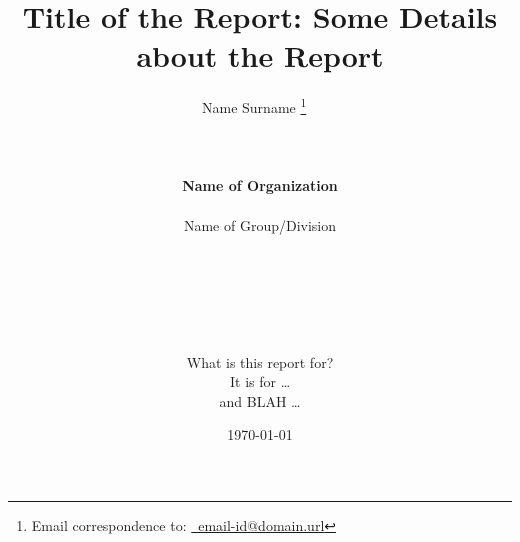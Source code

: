 \documentclass[letterpaper,12pt]{report}
\begin{document}










%
%
\title{\Huge \bf Title of the Report: Some Details about the Report}

\date{\today}

\author{{\LARGE Name Surname}
\thanks{Email correspondence to: \href{mailto:email-id@domain.url}{\Email\ email-id@domain.url}}
\ \\
\vspace{-4.0in}
\ \\
\ \\
\ \\
{\bf \LARGE
	Name of Organization
	\vspace{0.1cm}} \\
\hline
\ \\
{\Large \sc Name of Group/Division} \\
\ \\
\ \\
\ \\
\ \\
\ \\
\vspace{2.0in}
\ \\
{\large \sc What is this report for?} \\
{\large It is for \dots} \\
{\large and BLAH \dots}
}

\maketitle


\end{document}
